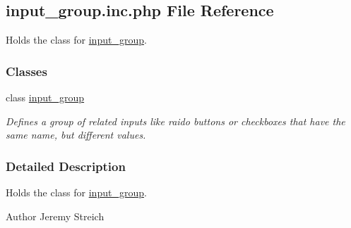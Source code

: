 \hypertarget{input__group_8inc_8php}{\subsection{input\-\_\-group.\-inc.\-php File Reference}
\label{input__group_8inc_8php}
}


Holds the class for \hyperlink{classinput__group}{input\-\_\-group}.  


\subsubsection*{Classes}
\begin{DoxyCompactItemize}
\item 
class \hyperlink{classinput__group}{input\-\_\-group}
\begin{DoxyCompactList}\small\item\em Defines a group of related inputs like raido buttons or checkboxes that have the same name, but different values. \end{DoxyCompactList}\end{DoxyCompactItemize}


\subsubsection{Detailed Description}
Holds the class for \hyperlink{classinput__group}{input\-\_\-group}. \begin{DoxyAuthor}{Author}
Jeremy Streich 
\end{DoxyAuthor}
